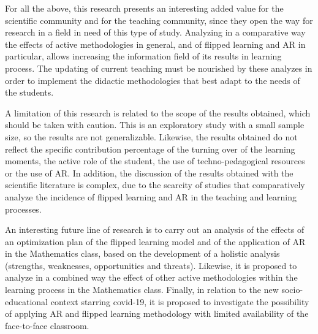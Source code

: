 \documentclass{textolivre}
\begin{document}
For all the above, this research presents an interesting added value for the scientific community and for the teaching community, since they open the way for research in a field in need of this type of study. Analyzing in a comparative way the effects of active methodologies in general, and of flipped learning and AR in particular, allows increasing the information field of its results in learning process. The updating of current teaching must be nourished by these analyzes in order to implement the didactic methodologies that best adapt to the needs of the students.

A limitation of this research is related to the scope of the results obtained, which should be taken with caution. This is an exploratory study with a small sample size, so the results are not generalizable. Likewise, the results obtained do not reflect the specific contribution percentage of the turning over of the learning moments, the active role of the student, the use of techno-pedagogical resources or the use of AR. In addition, the discussion of the results obtained with the scientific literature is complex, due to the scarcity of studies that comparatively analyze the incidence of flipped learning and AR in the teaching and learning processes.

An interesting future line of research is to carry out an analysis of the effects of an optimization plan of the flipped learning model and of the application of AR in the Mathematics class, based on the development of a holistic analysis (strengths, weaknesses, opportunities and threats). Likewise, it is proposed to analyze in a combined way the effect of other active methodologies within the learning process in the Mathematics class. Finally, in relation to the new socio-educational context starring covid-19, it is proposed to investigate the possibility of applying AR and flipped learning methodology with limited availability of the face-to-face classroom.







\printbibliography\label{sec-bib}
\end{document}
